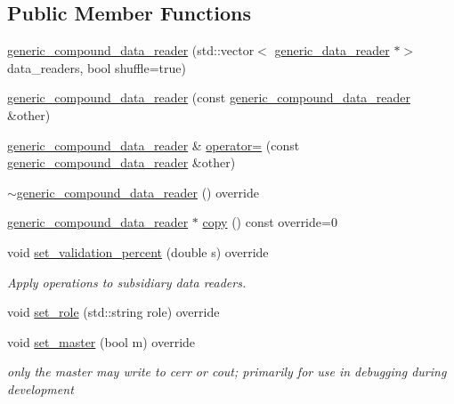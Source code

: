 \subsection*{Public Member Functions}
\begin{DoxyCompactItemize}
\item 
\hyperlink{classlbann_1_1generic__compound__data__reader_ab2ed3059169e556e4310a55fa99c1f07}{generic\+\_\+compound\+\_\+data\+\_\+reader} (std\+::vector$<$ \hyperlink{classlbann_1_1generic__data__reader}{generic\+\_\+data\+\_\+reader} $\ast$$>$ data\+\_\+readers, bool shuffle=true)
\item 
\hyperlink{classlbann_1_1generic__compound__data__reader_ae047b146f674bc806418f8db64c47bee}{generic\+\_\+compound\+\_\+data\+\_\+reader} (const \hyperlink{classlbann_1_1generic__compound__data__reader}{generic\+\_\+compound\+\_\+data\+\_\+reader} \&other)
\item 
\hyperlink{classlbann_1_1generic__compound__data__reader}{generic\+\_\+compound\+\_\+data\+\_\+reader} \& \hyperlink{classlbann_1_1generic__compound__data__reader_a7ece97b6fd2bc62da4d98f29cfb50155}{operator=} (const \hyperlink{classlbann_1_1generic__compound__data__reader}{generic\+\_\+compound\+\_\+data\+\_\+reader} \&other)
\item 
\hyperlink{classlbann_1_1generic__compound__data__reader_a9fbabf1628a892500e1cd8f75738ce7d}{$\sim$generic\+\_\+compound\+\_\+data\+\_\+reader} () override
\item 
\hyperlink{classlbann_1_1generic__compound__data__reader}{generic\+\_\+compound\+\_\+data\+\_\+reader} $\ast$ \hyperlink{classlbann_1_1generic__compound__data__reader_a197f5fd06679f777a709453830fcc4f9}{copy} () const override=0
\item 
void \hyperlink{classlbann_1_1generic__compound__data__reader_a6b8288801972561d9758337c61eb39b8}{set\+\_\+validation\+\_\+percent} (double s) override
\begin{DoxyCompactList}\small\item\em Apply operations to subsidiary data readers. \end{DoxyCompactList}\item 
void \hyperlink{classlbann_1_1generic__compound__data__reader_a19302078a484337e86b1549b48ef13ad}{set\+\_\+role} (std\+::string role) override
\item 
void \hyperlink{classlbann_1_1generic__compound__data__reader_ae703ef84ca1c77221f4724a799f9ad0d}{set\+\_\+master} (bool m) override
\begin{DoxyCompactList}\small\item\em only the master may write to cerr or cout; primarily for use in debugging during development \end{DoxyCompactList}\item 
$$
\end{DoxyCompactItemize}
